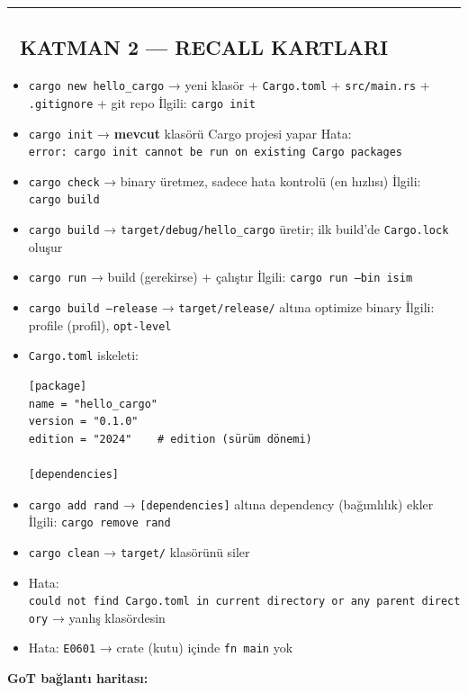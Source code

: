 \documentclass[12pt,a4paper]{article}
\begin{document}
\begin{center}\rule{0.5\linewidth}{0.5pt}\end{center}

\subsection{🔵 KATMAN 2 --- RECALL KARTLARI}\label{katman-2-—-recall-kartlari}

\begin{itemize}
\tightlist
\item
  \texttt{cargo\ new\ hello\_cargo} → yeni klasör + \texttt{Cargo.toml} + \texttt{src/main.rs} + \texttt{.gitignore} + git repo
  İlgili: \texttt{cargo\ init}
\item
  \texttt{cargo\ init} → \textbf{mevcut} klasörü Cargo projesi yapar
  Hata: \texttt{error:\ cargo\ init\ cannot\ be\ run\ on\ existing\ Cargo\ packages}
\item
  \texttt{cargo\ check} → binary üretmez, sadece hata kontrolü (en hızlısı)
  İlgili: \texttt{cargo\ build}
\item
  \texttt{cargo\ build} → \texttt{target/debug/hello\_cargo} üretir; ilk build'de \texttt{Cargo.lock} oluşur
\item
  \texttt{cargo\ run} → build (gerekirse) + çalıştır
  İlgili: \texttt{cargo\ run\ --bin\ isim}
\item
  \texttt{cargo\ build\ --release} → \texttt{target/release/} altına optimize binary
  İlgili: profile (profil), \texttt{opt-level}
\item
  \texttt{Cargo.toml} iskeleti:

\begin{verbatim}
[package]
name = "hello_cargo"
version = "0.1.0"
edition = "2024"    # edition (sürüm dönemi)

[dependencies]
\end{verbatim}
\item
  \texttt{cargo\ add\ rand} → \texttt{{[}dependencies{]}} altına dependency (bağımlılık) ekler
  İlgili: \texttt{cargo\ remove\ rand}
\item
  \texttt{cargo\ clean} → \texttt{target/} klasörünü siler
\item
  Hata: \texttt{could\ not\ find\ Cargo.toml\ in\ current\ directory\ or\ any\ parent\ directory} → yanlış klasördesin
\item
  Hata: \texttt{E0601} → crate (kutu) içinde \texttt{fn\ main} yok
\end{itemize}

\textbf{GoT bağlantı haritası:}
\end{document}
